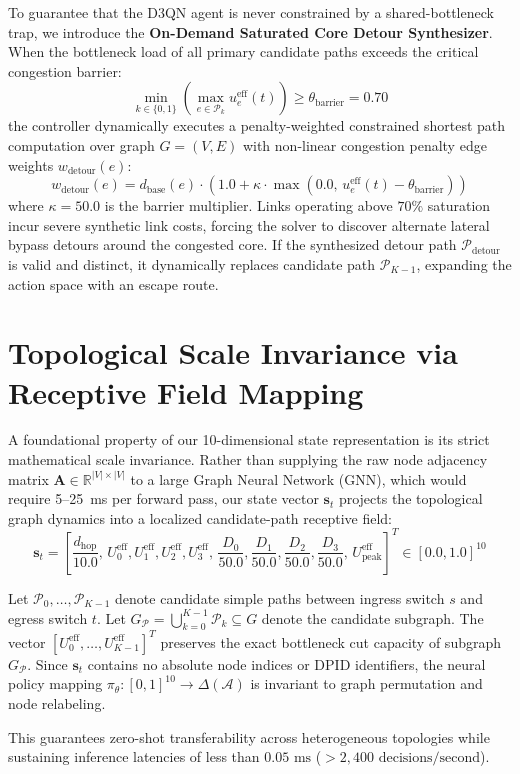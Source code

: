 To guarantee that the D3QN agent is never constrained by a shared-bottleneck trap, we introduce the \textbf{On-Demand Saturated Core Detour Synthesizer}. When the bottleneck load of all primary candidate paths exceeds the critical congestion barrier:
\begin{equation}
    \min_{k \in \{0, 1\}} \left( \max_{e \in \mathcal{P}_k} u_e^{\text{eff}}(t) \right) \ge \theta_{\text{barrier}} = 0.70
\end{equation}
the controller dynamically executes a penalty-weighted constrained shortest path computation over graph $G = (V, E)$ with non-linear congestion penalty edge weights $w_{\text{detour}}(e)$:
\begin{equation}
    w_{\text{detour}}(e) = d_{\text{base}}(e) \cdot \left( 1.0 + \kappa \cdot \max\left(0.0, \, u_e^{\text{eff}}(t) - \theta_{\text{barrier}}\right) \right)
\end{equation}
where $\kappa = 50.0$ is the barrier multiplier. Links operating above $70\%$ saturation incur severe synthetic link costs, forcing the solver to discover alternate lateral bypass detours around the congested core. If the synthesized detour path $\mathcal{P}_{\text{detour}}$ is valid and distinct, it dynamically replaces candidate path $\mathcal{P}_{K-1}$, expanding the action space with an escape route.

\section{Topological Scale Invariance via Receptive Field Mapping}
\label{sec:topological_scale_invariance}
A foundational property of our 10-dimensional state representation is its strict mathematical scale invariance. Rather than supplying the raw node adjacency matrix $\mathbf{A} \in \mathbb{R}^{|V| \times |V|}$ to a large Graph Neural Network (GNN), which would require 5--25~ms per forward pass, our state vector $\mathbf{s}_t$ projects the topological graph dynamics into a localized candidate-path receptive field:
\begin{equation}
    \mathbf{s}_t = \left[ \frac{d_{\text{hop}}}{10.0}, \, U_0^{\text{eff}}, U_1^{\text{eff}}, U_2^{\text{eff}}, U_3^{\text{eff}}, \, \frac{D_0}{50.0}, \frac{D_1}{50.0}, \frac{D_2}{50.0}, \frac{D_3}{50.0}, \, U_{\text{peak}}^{\text{eff}} \right]^T \in [0.0, 1.0]^{10}
\end{equation}
\begin{theorem}
Let $\mathcal{P}_0, \dots, \mathcal{P}_{K-1}$ denote candidate simple paths between ingress switch $s$ and egress switch $t$. Let $G_{\mathcal{P}} = \bigcup_{k=0}^{K-1} \mathcal{P}_k \subseteq G$ denote the candidate subgraph. The vector $[U_0^{\text{eff}}, \dots, U_{K-1}^{\text{eff}}]^T$ preserves the exact bottleneck cut capacity of subgraph $G_{\mathcal{P}}$. Since $\mathbf{s}_t$ contains no absolute node indices or DPID identifiers, the neural policy mapping $\pi_\theta: [0, 1]^{10} \to \Delta(\mathcal{A})$ is invariant to graph permutation and node relabeling.
\end{theorem}
This guarantees zero-shot transferability across heterogeneous topologies while sustaining inference latencies of less than $0.05\text{ ms}$ ($> 2,400\text{ decisions/second}$).
